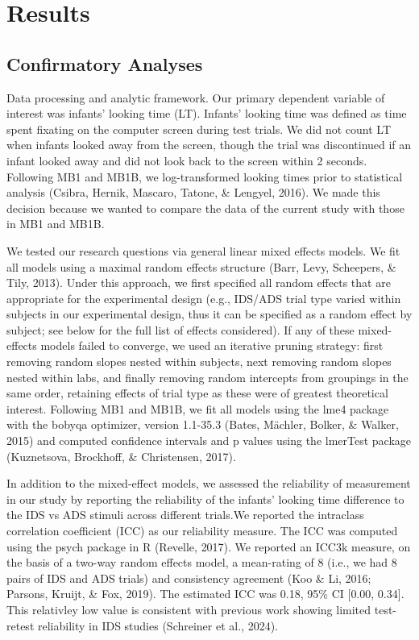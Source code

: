 \documentclass[
  ,man,floatsintext]{apa6}
\begin{document}
\hypertarget{results}{%
\section{Results}\label{results}}

\hypertarget{confirmatory-analyses}{%
\subsection{Confirmatory Analyses}\label{confirmatory-analyses}}

Data processing and analytic framework. Our primary dependent variable of interest was infants' looking time (LT). Infants' looking time was defined as time spent fixating on the computer screen during test trials. We did not count LT when infants looked away from the screen, though the trial was discontinued if an infant looked away and did not look back to the screen within 2 seconds. Following MB1 and MB1B, we log-transformed looking times prior to statistical analysis (Csibra, Hernik, Mascaro, Tatone, \& Lengyel, 2016). We made this decision because we wanted to compare the data of the current study with those in MB1 and MB1B.

We tested our research questions via general linear mixed effects models. We fit all models using a maximal random effects structure (Barr, Levy, Scheepers, \& Tily, 2013). Under this approach, we first specified all random effects that are appropriate for the experimental design (e.g., IDS/ADS trial type varied within subjects in our experimental design, thus it can be specified as a random effect by subject; see below for the full list of effects considered). If any of these mixed-effects models failed to converge, we used an iterative pruning strategy: first removing random slopes nested within subjects, next removing random slopes nested within labs, and finally removing random intercepts from groupings in the same order, retaining effects of trial type as these were of greatest theoretical interest. Following MB1 and MB1B, we fit all models using the lme4 package with the bobyqa optimizer, version 1.1-35.3 (Bates, Mächler, Bolker, \& Walker, 2015) and computed confidence intervals and p values using the lmerTest package (Kuznetsova, Brockhoff, \& Christensen, 2017).

In addition to the mixed-effect models, we assessed the reliability of measurement in our study by reporting the reliability of the infants' looking time difference to the IDS vs ADS stimuli across different trials.We reported the intraclass correlation coefficient (ICC) as our reliability measure. The ICC was computed using the psych package in R (Revelle, 2017). We reported an ICC3k measure, on the basis of a two-way random effects model, a mean-rating of 8 (i.e., we had 8 pairs of IDS and ADS trials) and consistency agreement (Koo \& Li, 2016; Parsons, Kruijt, \& Fox, 2019). The estimated ICC was 0.18, 95\% CI {[}0.00, 0.34{]}. This relativley low value is consistent with previous work showing limited test-retest reliability in IDS studies (Schreiner et al., 2024).
\end{document}
